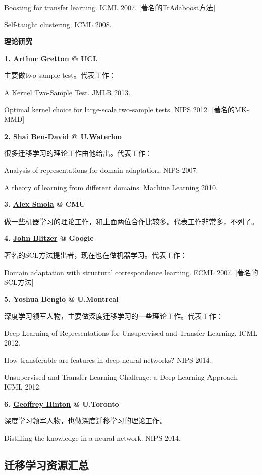 Boosting for transfer learning. ICML 2007. [著名的TrAdaboost方法]

Self-taught clustering. ICML 2008.


\textbf{理论研究}

\textbf{1. \href{http://www.gatsby.ucl.ac.uk/~gretton/}{Arthur Gretton} @ UCL}

主要做two-sample test。代表工作：

A Kernel Two-Sample Test. JMLR 2013.

Optimal kernel choice for large-scale two-sample tests. NIPS 2012. [著名的MK-MMD]


\textbf{2. \href{https://cs.uwaterloo.ca/~shai/}{Shai Ben-David} @ U.Waterloo}

很多迁移学习的理论工作由他给出。代表工作：

Analysis of representations for domain adaptation. NIPS 2007.

A theory of learning from different domains. Machine Learning 2010.


\textbf{3. \href{https://alex.smola.org/}{Alex Smola} @ CMU}

做一些机器学习的理论工作，和上面两位合作比较多。代表工作非常多，不列了。

\textbf{4. \href{https://alex.smola.org/}{John Blitzer} @ Google}

著名的SCL方法提出者，现在也在做机器学习。代表工作：

Domain adaptation with structural correspondence learning. ECML 2007. [著名的SCL方法]


\textbf{5. \href{http://www.iro.umontreal.ca/~bengioy/yoshua_en/index.html}{Yoshua Bengio} @ U.Montreal}

深度学习领军人物，主要做深度迁移学习的一些理论工作。代表工作：

Deep Learning of Representations for Unsupervised and Transfer Learning. ICML 2012.

How transferable are features in deep neural networks? NIPS 2014.

Unsupervised and Transfer Learning Challenge: a Deep Learning Approach. ICML 2012.


\textbf{6. \href{http://www.iro.umontreal.ca/~bengioy/yoshua_en/index.html}{Geoffrey Hinton} @ U.Toronto}

深度学习领军人物，也做深度迁移学习的理论工作。

Distilling the knowledge in a neural network. NIPS 2014.

\subsection{迁移学习资源汇总}


